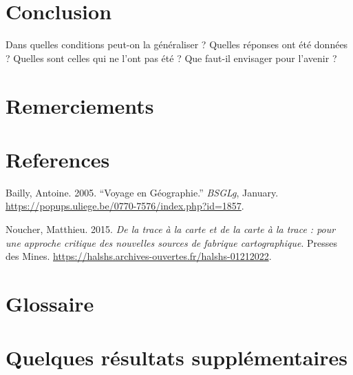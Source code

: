 \documentclass[
  12pt,
  a4paperpaper,
]{book}
\newlength{\cslhangindent}
\newlength{\cslentryspacingunit} %
\newenvironment{CSLReferences}[2] %
 {%
  \setlength{\parindent}{0pt}
  \ifodd #1
  \let\oldpar\par
  \def\par{\hangindent=\cslhangindent\oldpar}
  \fi
  \setlength{\parskip}{#2\cslentryspacingunit}
 }%
 {}
\begin{document}

\hypertarget{conclusion}{%
\chapter*{Conclusion}\label{conclusion}}

Dans quelles conditions peut-on la généraliser ? Quelles réponses ont
été données ? Quelles sont celles qui ne l'ont pas été ? Que faut-il
envisager pour l'avenir ?


\hypertarget{remerciements}{%
\chapter*{Remerciements}\label{remerciements}}


\hypertarget{references}{%
\chapter*{References}\label{references}}

\hypertarget{refs}{}
\begin{CSLReferences}{1}{0}
\leavevmode{}%
Bailly, Antoine. 2005. {``Voyage en Géographie.''} \emph{BSGLg},
January. \url{https://popups.uliege.be/0770-7576/index.php?id=1857}.

\leavevmode{}%
Noucher, Matthieu. 2015. \emph{De la trace à la carte et de la carte à
la trace : pour une approche critique des nouvelles sources de fabrique
cartographique}. Presses des Mines.
\url{https://halshs.archives-ouvertes.fr/halshs-01212022}.

\end{CSLReferences}

\appendix
{}

\hypertarget{glossaire}{%
\chapter*{Glossaire}\label{glossaire}}

\hypertarget{quelques-ruxe9sultats-suppluxe9mentaires}{%
\chapter*{Quelques résultats
supplémentaires}\label{quelques-ruxe9sultats-suppluxe9mentaires}}
\end{document}
